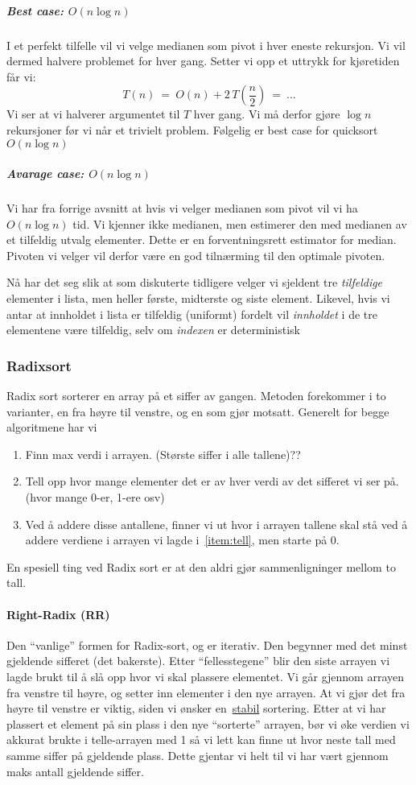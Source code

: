 \subparagraph{Best case: $ O(n\log n) $}
I et perfekt tilfelle vil vi velge medianen som pivot i hver eneste rekursjon. Vi vil dermed halvere problemet for hver gang. Setter vi opp et uttrykk for kjøretiden får vi:
\[ T(n) ~=~ O(n) + 2\,T\left( \frac{n}{2} \right) ~=~ ... \]
Vi ser at vi halverer argumentet til $ T $ hver gang. Vi må derfor gjøre $ \log n $ rekursjoner før vi når et trivielt problem. Følgelig er best case for quicksort $ O(n\log n) $

\subparagraph{Avarage case: $ O(n\log n) $}
Vi har fra forrige avsnitt at hvis vi velger medianen som pivot vil vi ha $ O(n\log n) $ tid.  Vi kjenner ikke medianen, men estimerer den med medianen av et tilfeldig utvalg elementer. Dette er en forventningsrett estimator for median. Pivoten vi velger vil derfor være en god tilnærming til den optimale pivoten. 

Nå har det seg slik at som diskuterte tidligere velger vi sjeldent tre \emph{tilfeldige} elementer i lista, men heller første, midterste og siste element. Likevel, hvis vi antar at innholdet i lista er tilfeldig (uniformt) fordelt vil \emph{innholdet} i de tre elementene være tilfeldig, selv om \emph{indexen} er deterministisk



\subsubsection{\color{red}Radixsort}\label{radixsort}
Radix sort sorterer en array på et siffer av gangen.
Metoden forekommer i to varianter, en fra høyre til venstre, og en som gjør
motsatt. Generelt for begge algoritmene har vi
\begin{enumerate}
\item Finn max verdi i arrayen. (Største siffer i alle tallene)\color{red}??
\item\label{item:tell} Tell opp hvor mange elementer det er av hver verdi av det sifferet vi ser
  på. (hvor mange 0-er, 1-ere osv)
\item Ved å addere disse antallene, finner vi ut hvor i arrayen tallene skal stå
  ved å addere verdiene i arrayen vi lagde i~\ref{item:tell}, men starte på 0.
\end{enumerate}
En spesiell ting ved Radix sort er at den aldri gjør sammenligninger mellom to
tall.

\paragraph{\color{red}Right-Radix (RR)}
Den ``vanlige'' formen for Radix-sort, og er iterativ.
Den begynner med det minst gjeldende sifferet (det bakerste). Etter
``fellesstegene'' blir den siste arrayen vi lagde brukt til å slå opp hvor vi
skal plassere elementet. Vi går gjennom arrayen fra venstre til høyre, og setter
inn elementer i den nye arrayen. At vi gjør det fra høyre til venstre er viktig,
siden vi ønsker en~\hyperref[stabil]{stabil} sortering. Etter at vi har plassert
et element på sin plass i den nye ``sorterte'' arrayen, bør vi øke verdien vi
akkurat brukte i telle-arrayen med 1 så vi lett kan finne ut hvor neste tall med
samme siffer på gjeldende plass. Dette gjentar vi helt til vi har vært gjennom
maks antall gjeldende siffer.

